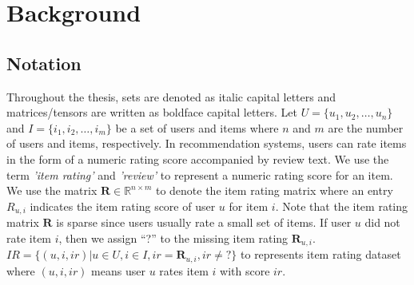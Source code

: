 \documentclass[master,english,final]{kaist-ucs}
\begin{document}





%

\chapter{Background}
\section{Notation}
Throughout the thesis, sets are denoted as italic capital letters and matrices/tensors are written as boldface capital letters.
Let $U = \{u_1,u_2,…,u_n\}$ and $I = \{i_1,i_2,…,i_m\}$ be a set of users and items where $n$ and $m$ are the number of users and items, respectively.
In recommendation systems, users can rate items in the form of a numeric rating score accompanied by review text.
We use the term \textit{'item rating'} and \textit{'review'} to represent a numeric rating score for an item.
We use the matrix $ \bm{R} \in \mathbb{R}^{n \times m} $ to denote the item rating matrix where an entry $ R_{u,i} $ indicates the item rating score of user $u$ for item $i$.
Note that the item rating matrix $\bm{R}$ is sparse since users usually rate a small set of items.
If user $u$ did not rate item $i$, then we assign “?” to the missing item rating $\bm{R}_{u,i}$.
$IR=\{(u,i,ir)| u \in U,i \in I,ir=\bm{R}_{u,i},ir \neq ? \}$ to represents item rating dataset where $(u,i,ir)$ means user $u$ rates item $i$ with score $ir$.
\end{document}
